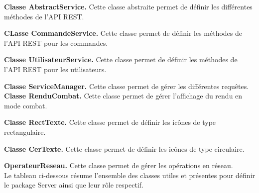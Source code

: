 \documentclass[11pt, a4paper]{article}
\begin{document}
  \textbf{Classe AbstractService.} Cette classe abstraite permet de définir les différentes méthodes de l'API REST.
  
  \textbf{CLasse CommandeService.} Cette classe permet de définir les méthodes de l'API REST pour les commandes.
  
  \textbf{Classe UtilisateurService.} Cette classe permet de définir les méthodes de l'API REST pour les utilisateurs.
  
  \textbf{Classe ServiceManager.} Cette classe permet de gérer les différentes requêtes.\\
  
  \textbf{Classe RenduCombat.} Cette classe permet de gérer l'affichage du rendu en mode combat.
  
  \textbf{Classe RectTexte.} Cette classe permet de définir les icônes de type rectangulaire.
  
  \textbf{Classe CerTexte.} Cette classe permet de définir les icônes de type circulaire.
  
  \textbf{OperateurReseau.} Cette classe permet de gérer les opérations en réseau.\\

  
  Le tableau ci-dessous résume l'ensemble des classes utiles et présentes pour définir le package Server ainsi que leur rôle respectif.\\
 
\end{document}
